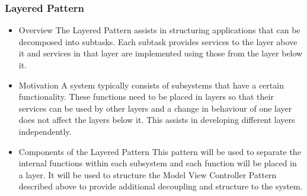 \documentclass[a4paper,12pt]{article}
\begin{document}
\subsubsection{Layered Pattern}
\begin{itemize}
\item{Overview}
\newline
The Layered Pattern assists in structuring applications that can be decomposed into subtasks. Each subtask provides services to the layer above it and services in that layer are implemented using those from the layer below it.

\item{Motivation}
\newline
A system typically consists of subsystems that have a certain functionality. These functions need to be placed in layers so that their services can be used by other layers and a change in behaviour of one layer does not affect the layers below it. This assists in developing different layers independently. 

\item{Components of the Layered Pattern}
\newline
This pattern will be used to separate the internal functions within each subsystem and each function will be placed in a layer. It will be used to structure the Model View Controller Pattern described above to provide additional decoupling and structure to the system.
\newline

\end{itemize}
\end{document}
